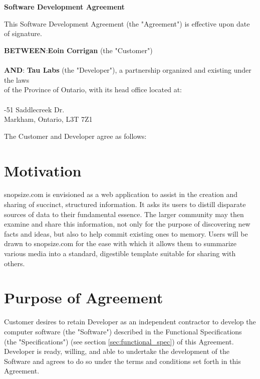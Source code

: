 \documentclass[11pt]{article}
\begin{document}

\newpage
\newpage
\section*{}
\begin{center}
{\bf \LARGE Software Development Agreement} 
\end{center}
\setlength{\parskip}{24pt} %
This Software Development Agreement (the "Agreement") is effective upon date of signature.
\setlength{\parskip}{6pt} %
\begin{tabbing}
{\bf BETWEEN}:\hspace{0.2in}\={\bf Eoin Corrigan} (the "Customer") \\
\> \\
{\bf AND}:\> {\bf Tau Labs } (the "Developer"), a partnership organized and existing under the laws \\
\>of the Province of Ontario, with its head office located at: \\
\> \\
-51 Saddlecreek Dr. \\
\> Markham, Ontario,  L3T 7Z1 \\
\end{tabbing}
The Customer and Developer agree as follows:
\section{Motivation}
snopsize.com is envisioned as a web application to assist in the creation and sharing of succinct, structured information. It asks its users to distill disparate sources of data to their fundamental essence. The larger community may then examine and share this information, not only for the purpose of discovering new facts and ideas, but also to help commit existing ones to memory. Users will be drawn to snopsize.com for the ease with which it allows them to summarize various media into a standard, digestible template suitable for sharing with others.
\section{Purpose of Agreement}
Customer desires to retain Developer as an independent contractor to develop the computer software (the "Software") described in the Functional Specifications (the "Specifications") (see section \ref{sec:functional_spec}) of this Agreement. Developer is ready, willing, and able to undertake the development of the Software and agrees to do so under the terms and conditions set forth in this Agreement.
\end{document}

